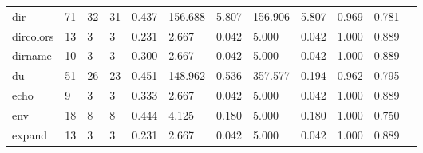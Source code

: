 \begin{longtable}{lp{1.00cm}p{1.00cm}p{1.00cm}p{1.00cm}p{1.00cm}p{1.00cm}p{1.00cm}p{1.00cm}p{1.00cm}p{1.00cm}p{1.00cm}}
dir       &                           71 &                 32 &                                31 &                                      0.437 &                                156.688 &                                        5.807 &                           156.906 &                                   5.807 &                        0.969 &                                        0.781 \\
dircolors &                           13 &                  3 &                                 3 &                                      0.231 &                                  2.667 &                                        0.042 &                             5.000 &                                   0.042 &                        1.000 &                                        0.889 \\
dirname   &                           10 &                  3 &                                 3 &                                      0.300 &                                  2.667 &                                        0.042 &                             5.000 &                                   0.042 &                        1.000 &                                        0.889 \\
du        &                           51 &                 26 &                                23 &                                      0.451 &                                148.962 &                                        0.536 &                           357.577 &                                   0.194 &                        0.962 &                                        0.795 \\
echo      &                            9 &                  3 &                                 3 &                                      0.333 &                                  2.667 &                                        0.042 &                             5.000 &                                   0.042 &                        1.000 &                                        0.889 \\
env       &                           18 &                  8 &                                 8 &                                      0.444 &                                  4.125 &                                        0.180 &                             5.000 &                                   0.180 &                        1.000 &                                        0.750 \\
expand    &                           13 &                  3 &                                 3 &                                      0.231 &                                  2.667 &                                        0.042 &                             5.000 &                                   0.042 &                        1.000 &                                        0.889 \\

\end{longtable}
